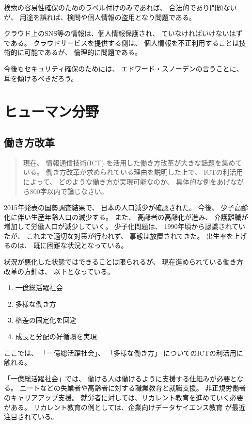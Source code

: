 \documentclass[12pt]{jsarticle}
\begin{document}
検索の容易性確保のためのラベル付けのみであれば、
合法的であり問題ないが、
用途を誤れば、検閲や個人情報の盗用となり問題である。

クラウド上のSNS等の情報は、個人情報保護され、
ていなければいけないはずである。
クラウドサービスを提供する側は、
個人情報を不正利用することは技術的に可能であるが、
倫理的に問題である。

今後もセキュリティ確保のためには、
エドワード・スノーデンの言うことに、
耳を傾けるべきだろう。
\section{ヒューマン分野}

\subsection{働き方改革}

\begin{quotation}
現在、 
情報通信技術(ICT)
を活用した働き方改革が大きな話題を集めている。
働き方改革が求められている理由を説明した上で、
ICTの利活用によって、
どのような働き方が実現可能なのか、
具体的な例をあげながら800字以内で論じなさい。
\end{quotation}

2015年発表の国勢調査結果で、
日本の人口減少が確認された。
今後、
少子高齢化に伴い生産年齢人口の減少する。
また、
高齢者の高齢化が進み、
介護離職が増加して労働人口が減少していく。
少子化問題は、
1990年頃から認識されていたが、
これまで適切な対策が行われず、
事態は放置されてきた。
出生率を上げるのは、
既に困難な状況となっている。

状況が悪化した状態ではできることは限られるが、
現在進められている働き方改革の方針は、
以下となっている。

\begin{enumerate}
\item 一億総活躍社会
\item 多様な働き方
\item 格差の固定化を回避
\item 成長と分配の好循環を実現
\end{enumerate}

ここでは、
「一億総活躍社会」、
「多様な働き方」
についてのICTの利活用に触れる。

「一億総活躍社会」では、
働ける人は働けるように支援する仕組みが必要となる。
ニートなどの失業者や高齢者に対する職業教育と就職支援。
非正規労働者のキャリアアップ支援。
就労者に対しては、リカレント教育を進めていく必要がある。
リカレント教育の例としては、企業向けデータサイエンス教育
が最近注目されている。
\end{document}
